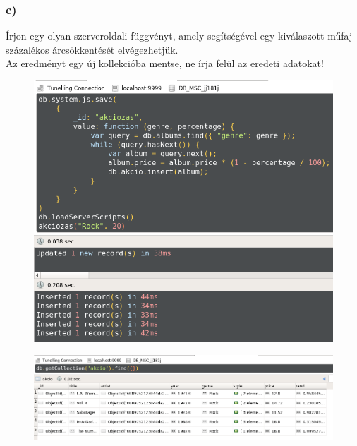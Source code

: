\documentclass[a4paper, 12pt]{article}
\begin{document}
\subsubsection*{c)}
Írjon egy olyan szerveroldali függvényt, amely segítségével egy kiválaszott műfaj százalékos árcsökkentését elvégezhetjük.\\Az eredményt egy új kollekcióba mentse, ne írja felül az eredeti adatokat!
\begin{figure}[!hb]
	\centering
	\includegraphics[scale = 0.65]{images/2_c1.png}
	\label{fig:2_c1}
\end{figure}
\begin{figure}[!hb]
	\centering
	\includegraphics[scale = 0.45]{images/2_c2.png}
	\label{fig:2_c2}
\end{figure}
\clearpage
\end{document}
